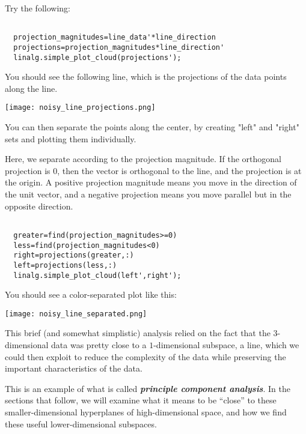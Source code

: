 \documentclass{ximera}
\begin{document}
Try the following:

\begin{verbatim}

  projection_magnitudes=line_data'*line_direction
  projections=projection_magnitudes*line_direction'
  linalg.simple_plot_cloud(projections');

\end{verbatim}

You should see the following line, which is the projections of the data points along the line.

\begin{center}
  \texttt{[image: noisy\_line\_projections.png]}
\end{center}

You can then separate the points along the center, by creating "left" and "right" sets and plotting them individually.

Here, we separate according to the projection magnitude. If the orthogonal projection is $0$, then the vector is orthogonal to the line, and the projection is at the origin. A positive projection magnitude means you move in the direction of the unit vector, and a negative projection means you move parallel but in the opposite direction.

\begin{verbatim}

  greater=find(projection_magnitudes>=0)
  less=find(projection_magnitudes<0)
  right=projections(greater,:)
  left=projections(less,:)
  linalg.simple_plot_cloud(left',right');

\end{verbatim}

You should see a color-separated plot like this:

\begin{center}
  \texttt{[image: noisy\_line\_separated.png]}
\end{center}

This brief (and somewhat simplistic) analysis relied on the fact that the $3$-dimensional data was pretty close to a $1$-dimensional subspace, a line, which we could then exploit to reduce the complexity of the data while preserving the important characteristics of the data. 

This is an example of what is called {\bf \emph{principle component analysis}}. In the sections that follow, we will examine what it means to be ``close'' to these smaller-dimensional hyperplanes of high-dimensional space, and how we find these useful lower-dimensional subspaces. 
\end{document}

